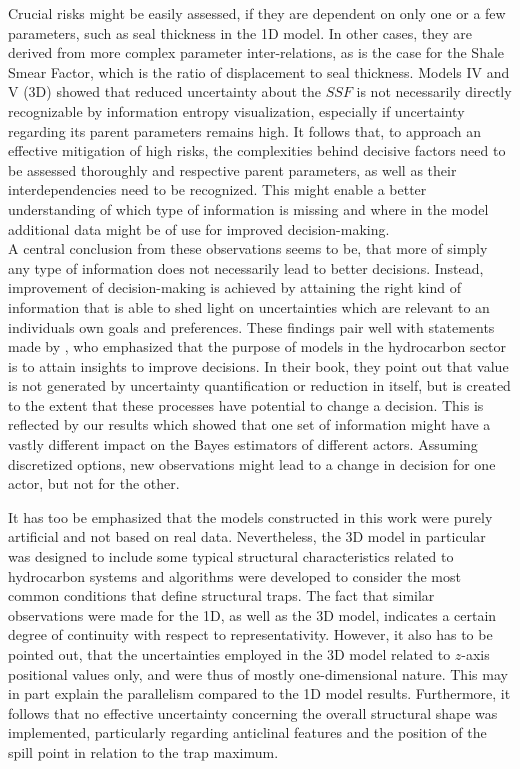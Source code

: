 	Crucial risks might be easily assessed, if they are dependent on only one or a few parameters, such as seal thickness in the 1D model. In other cases, they are derived from more complex parameter inter-relations, as is the case for the Shale Smear Factor, which is the ratio of displacement to seal thickness. Models IV and V (3D) showed that reduced uncertainty about the $SSF$ is not necessarily directly recognizable by information entropy visualization, especially if uncertainty regarding its parent parameters remains high. It follows that, to approach an effective mitigation of high risks, the complexities behind decisive factors need to be assessed thoroughly and respective parent parameters, as well as their interdependencies need to be recognized. This might enable a better understanding of which type of information is missing and where in the model additional data might be of use for improved decision-making.\\
	
	A central conclusion from these observations seems to be, that more of simply any type of information does not necessarily lead to better decisions. Instead, improvement of decision-making is achieved by attaining the right kind of information that is able to shed light on uncertainties which are relevant to an individuals own goals and preferences. These findings pair well with statements made by \citet{bratvold2010making}, who emphasized that the purpose of models in the hydrocarbon sector is to attain insights to improve decisions. In their book, they point out that value is not generated by uncertainty quantification or reduction in itself, but is created to the extent that these processes have potential to change a decision. This is reflected by our results which showed that one set of information might have a vastly different impact on the Bayes estimators of different actors. Assuming discretized options, new observations might lead to a change in decision for one actor, but not for the other. 	

	It has too be emphasized that the models constructed in this work were purely artificial and not based on real data. Nevertheless, the 3D model in particular was designed to include some typical structural characteristics related to hydrocarbon systems and algorithms were developed to consider the most common conditions that define structural traps. The fact that similar observations were made for the 1D, as well as the 3D model, indicates a certain degree of continuity with respect to representativity. However, it also has to be pointed out, that the uncertainties employed in the 3D model related to $z$-axis positional values only, and were thus of mostly  one-dimensional nature. This may in part explain the parallelism compared to the 1D model results. Furthermore, it follows that no effective uncertainty concerning the overall structural shape was implemented, particularly regarding anticlinal features and the position of the spill point in relation to the trap maximum.\\
	
